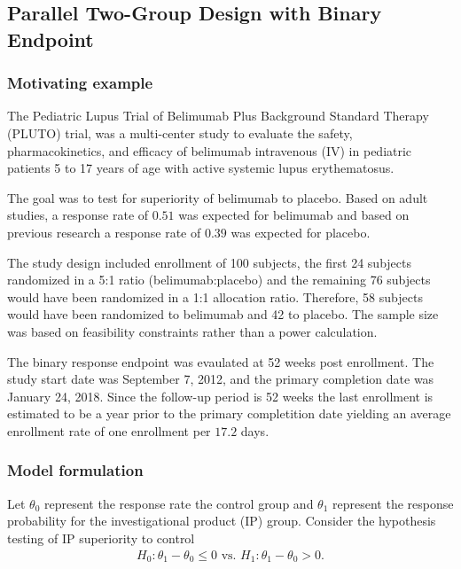 \documentclass[12pt]{article}
\begin{document}
\subsection{Parallel Two-Group Design with Binary Endpoint}
\subsubsection{Motivating example}
The Pediatric Lupus Trial of Belimumab Plus Background Standard Therapy (PLUTO) trial, was a multi-center study to evaluate the safety, pharmacokinetics, and efficacy of belimumab intravenous (IV) in pediatric patients 5 to 17 years of age with active systemic lupus erythematosus. 

The goal was to test for superiority of belimumab to placebo. Based on adult studies, a response rate of $0.51$ was expected for belimumab and based on previous research a response rate of $0.39$ was expected for placebo.

The study design included enrollment of 100 subjects, the first 24 subjects randomized in a 5:1 ratio (belimumab:placebo) and the remaining 76 subjects would have been randomized in a 1:1 allocation ratio. Therefore, 58 subjects would have been randomized to belimumab and 42 to placebo. The sample size was based on feasibility constraints rather than a power calculation.

The binary response endpoint was evaulated at 52 weeks post enrollment. The study start date was September 7, 2012, and the primary completion date was January 24, 2018. Since the follow-up period is 52 weeks the last enrollment is estimated to be a year prior to the primary completition date yielding an average enrollment rate of one enrollment per $17.2$ days.
\subsubsection{Model formulation}
Let $\theta_0$ represent the response rate the control group and $\theta_1$ represent the response probability for the investigational product (IP) group. 
Consider the hypothesis testing of IP superiority to control
\begin{align*}
H_0:\theta_1-\theta_0\leq 0\text{ vs. }H_1: \theta_1-\theta_0>0.
\end{align*}
\end{document}
